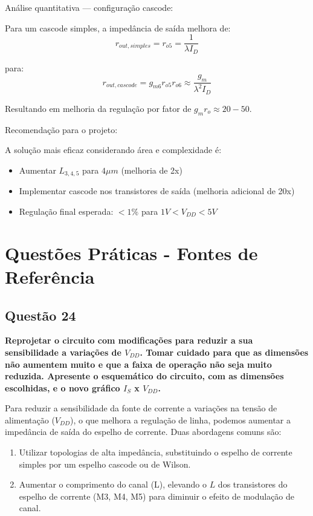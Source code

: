 ﻿\documentclass[12pt,a4paper]{article}
\begin{document}
Análise quantitativa — configuração cascode:

Para um cascode simples, a impedância de saída melhora de:
\begin{equation*}
r_{out,simples} = r_{o5} = \frac{1}{\lambda I_D}
\end{equation*}

para:
\begin{equation*}
r_{out,cascode} = g_{m6} r_{o5} r_{o6} \approx \frac{g_m}{\lambda^2 I_D}
\end{equation*}

Resultando em melhoria da regulação por fator de $g_m r_o \approx 20-50$.

Recomendação para o projeto:

A solução mais eficaz considerando área e complexidade é:
\begin{itemize}
    \item Aumentar $L_{3,4,5}$ para $4\mu m$ (melhoria de 2x)
    \item Implementar cascode nos transistores de saída (melhoria adicional de 20x)
    \item Regulação final esperada: $< 1\%$ para $1V < V_{DD} < 5V$
\end{itemize}

\newpage

\section*{Questões Práticas - Fontes de Referência}

\subsection*{Questão 24}

\textbf{Reprojetar o circuito com modificações para reduzir a sua sensibilidade a variações de $V_{DD}$. Tomar cuidado para que as dimensões não aumentem muito e que a faixa de operação não seja muito reduzida. Apresente o esquemático do circuito, com as dimensões escolhidas, e o novo gráfico $I_S$ x $V_{DD}$.}

Para reduzir a sensibilidade da fonte de corrente a variações na tensão de alimentação ($V_{DD}$), o que melhora a regulação de linha, podemos aumentar a impedância de saída do espelho de corrente. Duas abordagens comuns são:
\begin{enumerate}
    \item Utilizar topologias de alta impedância, substituindo o espelho de corrente simples por um espelho cascode ou de Wilson.
    \item Aumentar o comprimento do canal (L), elevando o $L$ dos transistores do espelho de corrente (M3, M4, M5) para diminuir o efeito de modulação de canal.
\end{enumerate}
\end{document}
